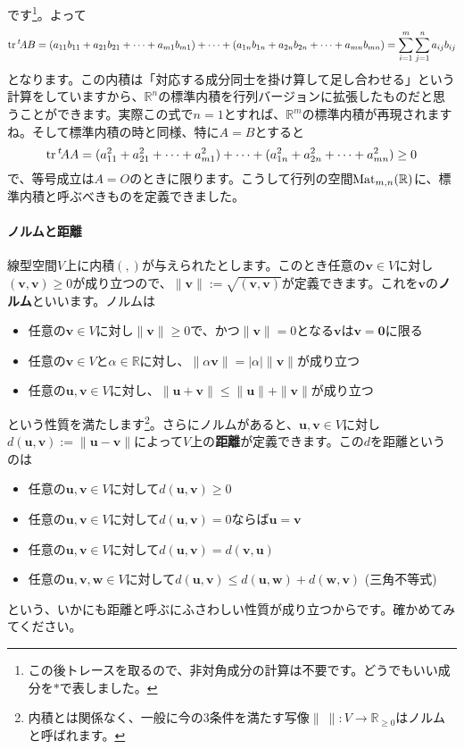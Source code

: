 です\footnote{この後トレースを取るので、非対角成分の計算は不要です。どうでもいい成分を$*$で表しました。}。よって
\[
\operatorname{tr} {}^t\!A B
= (a_{11}b_{11} + a_{21}b_{21} + \cdots + a_{m1}b_{m1}) + \cdots + (a_{1n}b_{1n} + a_{2n}b_{2n} + \cdots + a_{mn}b_{mn})
= \sum_{i = 1}^{m} \sum_{j = 1}^n a_{ij}b_{ij}
\]
となります。この内積は「対応する成分同士を掛け算して足し合わせる」という計算をしていますから、$\mathbb{R}^n$の標準内積を行列バージョンに拡張したものだと思うことができます。実際この式で$n = 1$とすれば、$\mathbb{R}^m$の標準内積が再現されますね。そして標準内積の時と同様、特に$A = B$とすると
\[
\operatorname{tr} {}^t\!A A = (a_{11}^2 + a_{21}^2 + \cdots + a_{m1}^2) + \cdots + (a_{1n}^2 + a_{2n}^2 + \cdots + a_{mn}^2) \geq 0
\]
で、等号成立は$A = O$のときに限ります。こうして行列の空間$\operatorname{Mat}_{m, n}(\mathbb{R})$に、標準内積と呼ぶべきものを定義できました。

\paragraph{ノルムと距離} 線型空間$V$上に内積$(, )$が与えられたとします。このとき任意の$\bm{v} \in V$に対し$(\bm{v}, \bm{v}) \geq 0$が成り立つので、$\|\bm{v}\| := \sqrt{(\bm{v}, \bm{v})}$が定義できます。これを$\bm{v}$の\textbf{ノルム}といいます。ノルムは
\begin{itemize}
\item 任意の$\bm{v} \in V$に対し$\|\bm{v}\|\geq 0$で、かつ$\|\bm{v}\| = 0$となる$\bm{v}$は$\bm{v} = \bm{0}$に限る
\item 任意の$\bm{v} \in V$と$\alpha\in\mathbb{R}$に対し、$\|\alpha\bm{v}\| = |\alpha|\|\bm{v}\|$が成り立つ
\item 任意の$\bm{u}, \bm{v} \in V$に対し、$\|\bm{u} + \bm{v}\| \leq \|\bm{u}\| + \|\bm{v}\|$が成り立つ
\end{itemize}
という性質を満たします\footnote{内積とは関係なく、一般に今の$3$条件を満たす写像$\|\ \|\colon V\rightarrow\mathbb{R}_{\geq 0}$はノルムと呼ばれます。}。さらにノルムがあると、$\bm{u}, \bm{v} \in V$に対し$d(\bm{u}, \bm{v}) := \|\bm{u} - \bm{v}\|$によって$V$上の\textbf{距離}が定義できます。この$d$を距離というのは
\begin{itemize}
\item 任意の$\bm{u}, \bm{v} \in V$に対して$d(\bm{u}, \bm{v}) \geq 0$
\item 任意の$\bm{u}, \bm{v} \in V$に対して$d(\bm{u}, \bm{v}) = 0$ならば$\bm{u} = \bm{v}$
\item 任意の$\bm{u}, \bm{v} \in V$に対して$d(\bm{u}, \bm{v}) = d(\bm{v}, \bm{u})$
\item 任意の$\bm{u}, \bm{v}, \bm{w} \in V$に対して$d(\bm{u}, \bm{v}) \leq d(\bm{u}, \bm{w}) +d(\bm{w}, \bm{v})$ (三角不等式)
\end{itemize}
という、いかにも距離と呼ぶにふさわしい性質が成り立つからです。確かめてみてください。

